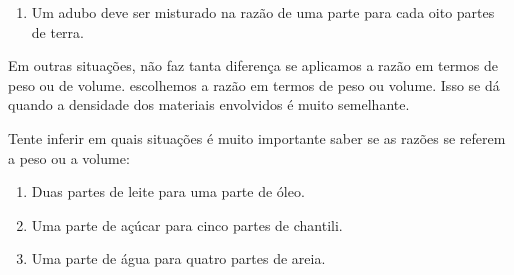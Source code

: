 \begin{knowledge}{}
\begin{enumerate}
\item {} 
Um adubo deve ser misturado na razão de uma parte para cada oito partes de terra.

\end{enumerate}

Em outras situações, não faz tanta diferença se aplicamos a razão em termos de peso ou de volume. escolhemos a razão em termos de peso ou volume. Isso se dá quando a densidade dos materiais envolvidos é muito semelhante.

Tente inferir em quais situações é muito importante saber se as razões se referem a peso ou a volume:
\begin{enumerate}
\item {} 
Duas partes de leite para uma parte de óleo.

\item {} 
Uma parte de açúcar para cinco partes de chantili.

\item {} 
Uma parte de água para quatro partes de areia.

\end{enumerate}
\end{knowledge}


